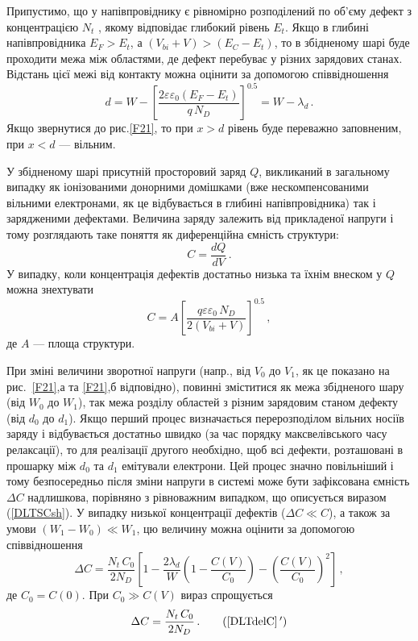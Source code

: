 Припустимо, що у напівпровіднику є рівномірно розподілений по об'єму дефект з концентрацією $N_t$ , якому
відповідає глибокий рівень $E_t$.
Якщо в глибині напівпровідника $E_F>E_t$, а $(V_{bi}+V)>(E_C-E_t)$,
то в збідненому шарі буде проходити межа між  областями, де дефект перебуває у різних зарядових станах.
Відстань цієї межі від контакту можна оцінити за допомогою співвідношення
\begin{equation}
d=W-\left[\frac{2\varepsilon\varepsilon_0(E_F-E_t)}{q\,N_D}\right]^{0.5}=W-\lambda_d\,.
\end{equation}
Якщо звернутися до рис.\ref{F21}, то при $x>d$
рівень буде переважно заповненим, при $x<d$ --- вільним.

У збідненому шарі присутній просторовий заряд $Q$, викликаний в загальному випадку
як іонізованими донорними домішками
(вже нескомпенсованими вільними електронами, як це відбувається в глибині напівпровідника)
так і зарядженими дефектами.
Величина заряду залежить від прикладеної напруги і тому розглядають таке поняття як диференційна
ємність структури:
\begin{equation}
\label{DLTSC}
C=\frac{dQ}{dV}\,.
\end{equation}
У випадку, коли концентрація дефектів достатньо низька та їхнім внеском у $Q$ можна знехтувати
\begin{equation}
\label{DLTSCsh}
C=A\left[\frac{q\varepsilon\varepsilon_0\,N_D}{2(V_{bi}+V)}\right]^{0.5}\,,
\end{equation}
де
$A$ --- площа структури.

При зміні величини зворотної напруги (напр., від $V_0$ до $V_1$,
як це показано на рис.~\ref{F21},а та \ref{F21},б відповідно),
повинні зміститися як межа збідненого шару (від $W_0$ до $W_1$),
так межа розділу областей з різним зарядовим станом дефекту (від $d_0$ до $d_1$).
Якщо перший процес визначається перерозподілом
вільних носіїв заряду і відбувається достатньо швидко (за час порядку максвелівського часу релаксації),
то для реалізації другого необхідно, щоб всі дефекти, розташовані в прошарку
між $d_0$ та $d_1$ емітували електрони.
Цей процес значно повільніший і тому безпосередньо після зміни напруги
в системі може бути зафіксована ємність $\Delta C$ надлишкова, порівняно з рівноважним випадком, що
описується виразом (\ref{DLTSCsh}).
У випадку низької концентрації дефектів ($\Delta C\ll C$), а також за умови $(W_1-W_0)\ll W_1$,
цю величину можна оцінити за допомогою співвідношення \cite{tuomisto2019}
\begin{equation}
\label{DLTdelC}
\Delta C=\frac{N_t\,C_0}{2N_D}\left[1-\frac{2\lambda_d}{W}\left(1-\frac{C(V)}{C_0}\right)-\left(\frac{C(V)}{C_0}\right)^2\right]\,,
\end{equation}
де
$C_0=C(0)$.
При $C_0\gg C(V)$ вираз спрощується
\begin{equation}
\label{DLTdelC*}
\Delta C=\frac{N_t\,C_0}{2N_D} \,.\tag{\ref{DLTdelC}\,$'$}
\end{equation}

